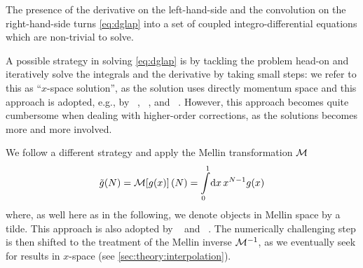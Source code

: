The presence of the derivative on the left-hand-side and the convolution on the
right-hand-side turns \cref{eq:dglap} into a set of coupled
integro-differential equations which are non-trivial to solve.

A possible strategy in solving \cref{eq:dglap} is by tackling the problem
head-on and iteratively solve the integrals and the derivative by taking small
steps: we refer to this as \enquote{$x$-space solution}, as the solution uses
directly momentum space and this approach is adopted, e.g., by \apfel{}~\cite{Bertone:2013vaa},
\hoppet{}~\cite{Salam:2008qg}, and \qcdnum{}~\cite{Botje:2010ay}.
However, this approach becomes quite cumbersome when dealing with higher-order
corrections, as the solutions becomes more and more involved.

We follow a different strategy and apply the Mellin transformation $\mathcal{M}$
\begin{equation}
    \tilde g(N) = \mathcal{M}\qty[g(x)](N) = \int\limits_0^1\!\dd{x} x^{N-1} g(x)
\end{equation}
where, as well here as in the following, we denote objects in Mellin space by a
tilde.
This approach is also adopted by \pegasus{}~\cite{Vogt:2004ns} and \fk{}~\cite{Ball:2008by,Ball:2010de,DelDebbio:2007ee}.
The numerically challenging step is then shifted to the treatment of the Mellin
inverse $\mathcal{M}^{-1}$, as we eventually seek for results in $x$-space (see
\cref{sec:theory:interpolation}).
